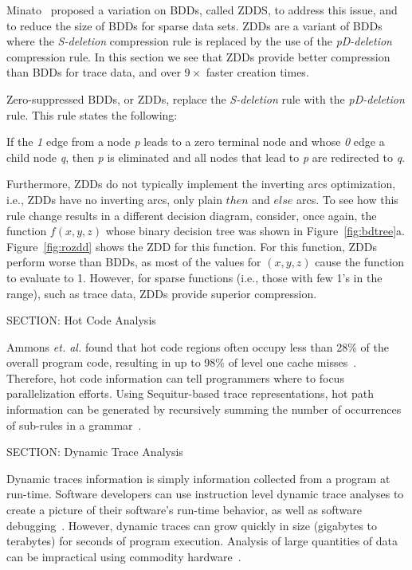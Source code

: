 {Minato~\cite{minato:93:dac} proposed a variation on BDDs, called ZDDS, to address this issue, and to reduce the size of BDDs for sparse data sets.  ZDDs are a variant of BDDs where the \textit{S-deletion} compression rule is replaced by the use of the \emph{pD-deletion} compression rule.  In this section we see that ZDDs provide better compression than BDDs for trace data, and over $9\times$ faster creation times.

Zero-suppressed BDDs, or ZDDs, replace the \textit{S-deletion} rule with the \textit{pD-deletion} rule.  This rule states the following: \begin{itemize}

 If the \textit{1} edge from a node \textit{p} leads to a zero
 terminal node and whose \textit{0} edge a child node \textit {q}, then \textit{p} is eliminated and all nodes that lead to \textit{p} are redirected to \textit{q}.

\end{itemize}

Furthermore, ZDDs do not typically implement the inverting arcs optimization, i.e., ZDDs have no inverting arcs, only plain $then$ and $else$ arcs.  To see how this rule change results in a different decision diagram, consider, once again, the function $f(x,y,z)$ whose binary decision tree was shown in Figure~\ref{fig:bdtree}a. Figure~\ref{fig:rozdd} shows the ZDD for this function. For this function, ZDDs perform worse than BDDs, as most of the values for $(x,y,z)$ cause the function to evaluate to 1.  However, for sparse functions (i.e., those with few 1's in the range), such as trace data, ZDDs provide superior compression.

SECTION: Hot Code Analysis


Ammons \textit{et. al.} found that hot code regions often occupy less than 28\% of the overall program code, resulting in up to 98\% of level one cache misses~\cite{ammons:97:sigplan}.  Therefore, hot code information can tell programmers where to focus parallelization efforts.  Using Sequitur-based trace representations, hot path information can be generated by recursively summing the number of occurrences of sub-rules in a grammar~\cite{larus:99:pldi}.

SECTION: Dynamic Trace Analysis


Dynamic traces information is simply information collected from a program at run-time.  Software developers can use instruction level dynamic trace analyses to create a picture of their software's run-time behavior, as well as software debugging~\cite{zhang:04:micro}.  However, dynamic traces can grow quickly in size (gigabytes to terabytes) for seconds of program execution. Analysis of large quantities of data can be impractical using commodity hardware~\cite{reiss:01:icse}.

}
